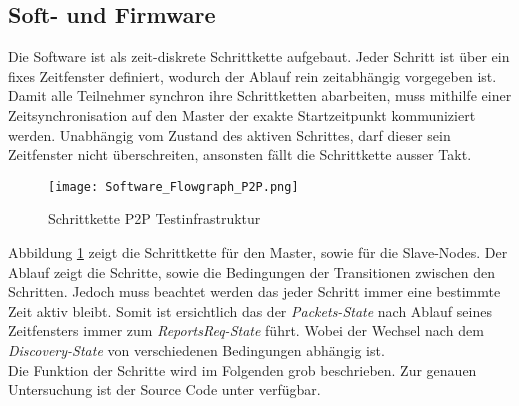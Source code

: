 \subsection{Soft- und Firmware}\label{sec:SoftundFirmware}

Die Software ist als zeit-diskrete Schrittkette aufgebaut. Jeder Schritt ist über ein fixes Zeitfenster definiert, wodurch der Ablauf rein zeitabhängig vorgegeben ist. Damit alle Teilnehmer synchron ihre Schrittketten abarbeiten, muss mithilfe einer Zeitsynchronisation auf den Master der exakte Startzeitpunkt kommuniziert werden. Unabhängig vom Zustand des aktiven Schrittes, darf dieser sein Zeitfenster nicht überschreiten, ansonsten fällt die Schrittkette ausser Takt. 

\begin{figure} [H]
	\centering
	\texttt{[image: Software\_Flowgraph\_P2P.png]}
	\caption{Schrittkette P2P Testinfrastruktur}
	\label{fig:FlowgraphP2P}
\end{figure}

Abbildung \ref{fig:FlowgraphP2P} zeigt die Schrittkette für den Master, sowie für die Slave-Nodes. Der Ablauf zeigt die Schritte, sowie die Bedingungen der Transitionen zwischen den Schritten. Jedoch muss beachtet werden das jeder Schritt immer eine bestimmte Zeit aktiv bleibt. Somit ist ersichtlich das der \textit{Packets-State} nach Ablauf seines Zeitfensters immer zum \textit{ReportsReq-State} führt. Wobei der Wechsel nach dem \textit{Discovery-State} von verschiedenen Bedingungen abhängig ist. \\

Die Funktion der Schritte wird im Folgenden grob beschrieben. Zur genauen Untersuchung ist der Source Code unter \cite{github_p6_software_p2p_2020} verfügbar.  \\

